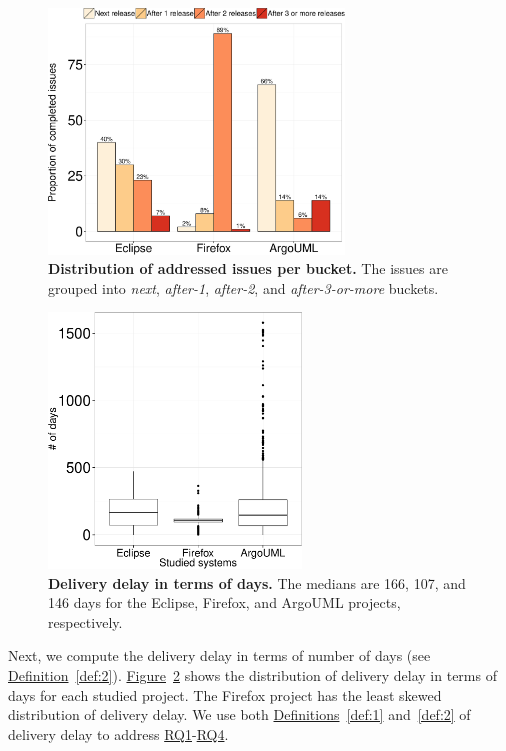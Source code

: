 \begin{figure}
	\centering
	\includegraphics[width=0.7\textwidth]
	{chapters/chapter4/figures/CS_rq1-datasets.pdf}
	\caption{\textbf{Distribution of addressed issues per bucket.} The issues are
		grouped into \textit{next}, \textit{after-1}, \textit{after-2}, and
	\textit{after-3-or-more} buckets.}
	\label{ch4:fig:fixToIntegration}
\end{figure}

\begin{figure}
	\centering
	\includegraphics[width=0.60\textwidth,keepaspectratio]
	{chapters/chapter4/figures/boxplot-days-per-system.pdf}
	\caption{\textbf{Delivery delay in terms of days.} The medians 
		are 166, 107, and 146 days for the Eclipse, Firefox, and
		ArgoUML projects, respectively.
	}
	\label{ch4:fig:beanplot_days}
\end{figure}

Next, we compute the delivery delay in terms of number of days (see
\hyperref[def:2]{Definition}~\ref{def:2}).
\hyperref[ch4:fig:beanplot_days]{Figure}~\ref{ch4:fig:beanplot_days} shows the
distribution of delivery delay in terms of days for each studied project. The
Firefox project has the least skewed distribution of delivery delay. We use both
\hyperref[def:1]{Definitions}~\ref{def:1} and~\ref{def:2} of delivery delay to
address \hyperref[ch4:rq1]{RQ1}-\hyperref[ch4:rq2]{RQ4}.   

